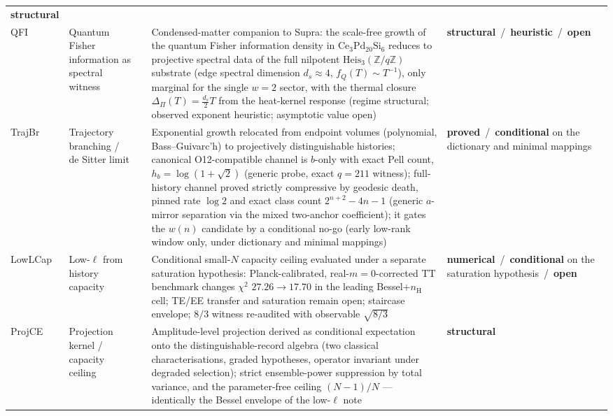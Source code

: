 \documentclass[11pt,a4paper]{article}
\newcommand{\Heis}{\mathrm{Heis}}
\newcommand{\sproved}{\textcolor{cproved}{\textbf{proved}}}
\newcommand{\sstruct}{\textcolor{cstruct}{\textbf{structural}}}
\newcommand{\sheur}{\textcolor{cheur}{\textbf{heuristic}}}
\newcommand{\sopen}{\textcolor{copen}{\textbf{open}}}
\newcommand{\snum}{\textcolor{cnum}{\textbf{numerical}}}
\newcommand{\scond}{\textcolor{ccond}{\textbf{conditional}}}
\begin{document}
\begin{longtable}{@{}p{1.70cm}p{2.9cm}p{1.3cm}p{6.25cm}>{\raggedright\arraybackslash}p{2.0cm}@{}}
      \sstruct \\[3pt]
      QFI & Quantum Fisher information as spectral witness & \cite{Beau2026qfi} &
      Condensed-matter companion to Supra: the scale-free growth of the quantum Fisher information
      density in $\mathrm{Ce}_3\mathrm{Pd}_{20}\mathrm{Si}_6$ reduces to projective spectral data of
      the full nilpotent $\Heis_3(\mathbb{Z}/q\mathbb{Z})$ substrate (edge spectral dimension
      $d_s \approx 4$, $f_Q(T) \sim T^{-1}$), only marginal for the single $w=2$ sector, with the
      thermal closure $\Delta_\Pi(T) = \tfrac{d_s}{2}T$ from the heat-kernel response
      (regime structural; observed exponent heuristic; asymptotic value open) &
      \sstruct\ /\ \sheur\ /\ \sopen \\[3pt]
      TrajBr & Trajectory branching / de Sitter limit & \cite{Beau2026tb} &
      Exponential growth relocated from endpoint volumes (polynomial, Bass--Guivarc'h) to projectively
      distinguishable histories; canonical O12-compatible channel is $b$-only with exact Pell count,
      $h_b = \log(1+\sqrt2)$ (generic probe, exact $q=211$ witness); full-history channel proved strictly
      compressive by geodesic death, pinned rate $\log 2$ and exact class count $2^{n+2}-4n-1$
      (generic $a$-mirror separation via the mixed two-anchor coefficient); it gates the $w(n)$
      candidate by a conditional no-go (early low-rank window only, under dictionary and minimal mappings) &
      \sproved\ /\ \scond{} on the dictionary and minimal mappings \\[3pt]
      LowLCap & Low-$\ell$ from history capacity & \cite{Beau2026dhc} &
      Conditional small-$N$ capacity ceiling evaluated under a separate saturation hypothesis:
      Planck-calibrated, real-$m=0$-corrected TT benchmark changes $\chi^2$ $27.26\to17.70$ in the
      leading Bessel+$n_{\mathrm H}$ cell; TE/EE transfer and saturation remain open; staircase envelope;
      $8/3$ witness re-audited with observable $\sqrt{8/3}$ &
      \snum\ /\ \scond{} on the saturation hypothesis\ /\ \sopen \\[3pt]
      ProjCE & Projection kernel / capacity ceiling & \cite{Beau2026pce} &
      Amplitude-level projection derived as conditional expectation onto the distinguishable-record
      algebra (two classical characterisations, graded hypotheses, operator invariant under degraded
      selection); strict ensemble-power suppression by total variance, and the parameter-free ceiling
      $(N-1)/N$ --- identically the Bessel envelope of the low-$\ell$ note &
      \sstruct \\[3pt]

\end{longtable}
\end{document}
